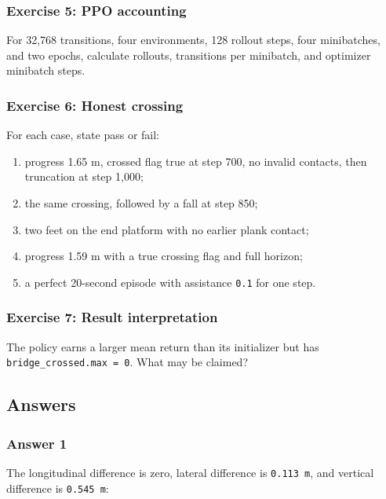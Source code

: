 \documentclass[
  american,
  11pt,
  letterpaper,
]{article}
\providecommand{\tightlist}{%
  \setlength{\itemsep}{0pt}\setlength{\parskip}{0pt}}
\begin{document}
\subsubsection{Exercise 5: PPO
accounting}\label{exercise-5-ppo-accounting}

For 32,768 transitions, four environments, 128 rollout steps, four
minibatches, and two epochs, calculate rollouts, transitions per
minibatch, and optimizer minibatch steps.

\subsubsection{Exercise 6: Honest
crossing}\label{exercise-6-honest-crossing}

For each case, state pass or fail:

\begin{enumerate}
\def\labelenumi{\arabic{enumi}.}
\tightlist
\item
  progress 1.65 m, crossed flag true at step 700, no invalid contacts,
  then truncation at step 1,000;
\item
  the same crossing, followed by a fall at step 850;
\item
  two feet on the end platform with no earlier plank contact;
\item
  progress 1.59 m with a true crossing flag and full horizon;
\item
  a perfect 20-second episode with assistance \texttt{0.1} for one step.
\end{enumerate}

\subsubsection{Exercise 7: Result
interpretation}\label{exercise-7-result-interpretation}

The policy earns a larger mean return than its initializer but has
\texttt{bridge\_crossed.max\ =\ 0}. What may be claimed?

\subsection{Answers}\label{answers-2}

\subsubsection{Answer 1}\label{answer-1}

The longitudinal difference is zero, lateral difference is
\texttt{0.113\ m}, and vertical difference is \texttt{0.545\ m}:
\end{document}
